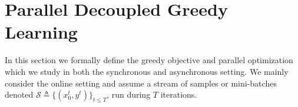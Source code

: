 \documentclass{article}
\begin{document}
    


\vspace{-2pt}
\section{Parallel Decoupled Greedy Learning}

In this section we %
formally define the greedy objective and parallel optimization which we %
study in both the synchronous and asynchronous setting. We %
mainly consider the online setting and assume a stream of samples or mini-batches denoted $\mathcal{S}\triangleq\{(x_0^t,y^t)\}_{t\leq T}$, run during $T$ iterations.
\end{document}
